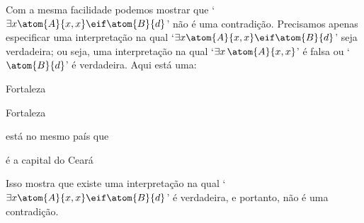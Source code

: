 Com a mesma facilidade podemos mostrar que `$\exists x\atom{A}{x,x} \eif \atom{B}{d}$' não é uma contradição.
Precisamos apenas especificar uma interpretação na qual `$\exists x\atom{A}{x,x} \eif \atom{B}{d}$' seja verdadeira; ou seja, uma interpretação na qual `$\exists x\, \atom{A}{x,x}$' é falsa ou `$\atom{B}{d}$' é verdadeira.
Aqui está uma:
\begin{center}
	\begin{ekey}
		\item[\text{domínio}] Fortaleza
		\item[d] Fortaleza
		\item[\atom{A}{x,y}]  está no mesmo país que 
		\item[\atom{B}{x}]  é a capital do Ceará
	\end{ekey}
\end{center}
Isso mostra que existe uma interpretação na qual `$\exists x\atom{A}{x,x} \eif \atom{B}{d}$' é verdadeira, e portanto, não é uma contradição.


